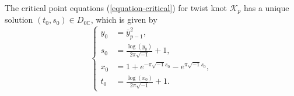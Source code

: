 \documentclass[12pt]{amsart}
\begin{document}
\begin{proposition} \label{prop-critcalequation}
     The critical point equations (\ref{equation-critical}) for twist knot $\mathcal{K}_p$ has a unique solution $(t_0,s_0)\in D_{0\mathbb{C}}$, which is given by
\begin{equation} \label{equation-solution}
\left\{ \begin{aligned}
        y_0&=\bar{y}_{p-1}^2,\\ s_0&=\frac{\log(y_0)}{2\pi\sqrt{-1}}+1,\\ x_0&=1+e^{-\pi\sqrt{-1}s_0}-e^{\pi\sqrt{-1}s_0}, \\ 
        t_0&=\frac{\log(x_0)}{2\pi\sqrt{-1}}+1. 
                          \end{aligned} \right.
                          \end{equation}
\end{proposition}
\end{document}
